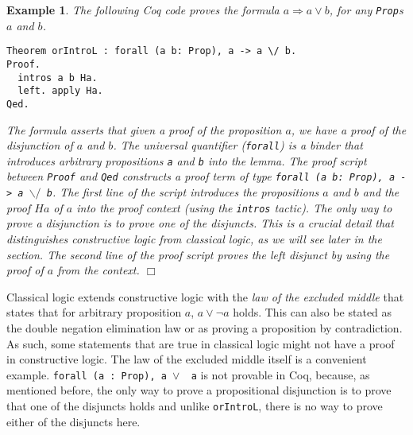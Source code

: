 \documentclass[11pt]{article}
\newtheorem{example}{Example}[section]
\begin{document}
	\begin{example}
		\em The following Coq
		code proves the formula
		$a \Rightarrow a \lor b$, for any 
		\texttt{Prop}s $a$ and $b$. 		
	\begin{verbatim}
Theorem orIntroL : forall (a b: Prop), a -> a \/ b.
Proof.
  intros a b Ha.
  left. apply Ha.
Qed.
	\end{verbatim}
		The formula asserts that given a 
		proof of the proposition $a$, we
		have a proof of the 
		disjunction of $a$ and $b$. The 
		universal quantifier 
		(\texttt{forall}) is a binder 
		that introduces arbitrary
		propositions \texttt{a} and 
		\texttt{b} into the lemma.
		The proof script between 
		\texttt{Proof} 
		and \texttt{Qed} constructs a 
		proof term of type \texttt{forall 
		(a b: Prop), a -> a $\backslash/$ b}. 
		The first line of the 
		script introduces 
		the propositions $a$ and $b$ and the 
		proof $Ha$ of $a$ into the 
		proof context (using the \texttt{intros}
		tactic). The only way to prove a 
		disjunction is to prove one 
		of the disjuncts. This is a crucial
		detail that distinguishes constructive
		logic from classical logic, as we 
		will see later in the section. 
		The second line of the proof script 
		proves the left disjunct by using 
		the proof of $a$ from the context.
		\hfill$\Box$
	\end{example}
	Classical logic extends 
	constructive logic with the 
	\textit{law of the excluded 
	middle} that states that for 
	arbitrary proposition $a$, 
	$a \lor \neg a$ holds. This can 
	also be stated as the 
	double negation elimination 
	law or as proving a 
	proposition by contradiction. As
	such, some statements that are true 
	in classical logic might not have 
	a proof in constructive logic.
	The law of the excluded middle
	itself is a convenient example.
	\texttt{forall (a : Prop), a $\lor$ ~a}
	is not provable in Coq, because,
	as mentioned before, the only way to 
	prove a propositional disjunction 
	is to prove that one of the disjuncts 
	holds and unlike \texttt{orIntroL},
	there is no way to prove either 
	of the disjuncts here.
	
\end{document}
